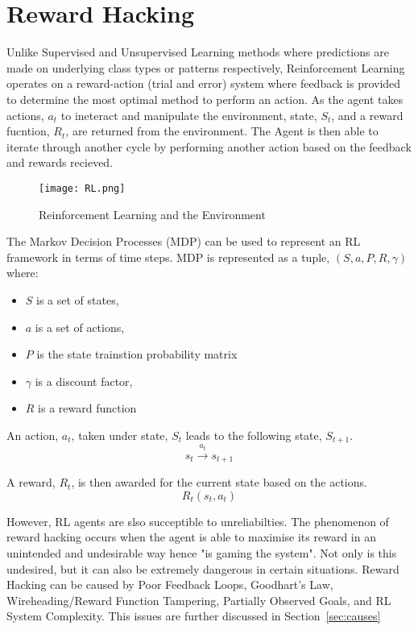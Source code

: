 \chapter{Reward Hacking}
Unlike Supervised and Unsupervised Learning methods where predictions are made on underlying class types or patterns respectively, 
Reinforcement Learning operates on a reward-action (trial and error) system where feedback is provided to determine the most optimal method to perform an action.
As the agent takes actions, $a_t$ to ineteract and manipulate the environment, state, $S_t$, and a reward fucntion, $R_t$, are returned from the environment. 
The Agent is then able to iterate through another cycle by performing another action based on the feedback and rewards recieved.

\begin{figure}[H]
    \centering
    \caption{Reinforcement Learning and the Environment \cite{amiri_mehrpouyan_fridman_mallik_nallanathan_matolak_2018}}
    \texttt{[image: RL.png]}
    \label{fig:RL}
\end{figure}

The Markov Decision Processes (MDP) can be used to represent an RL framework in terms of time steps.
MDP is represented as a tuple, $(S, a, P, R, \gamma)$ where:
\begin{itemize}
    \item $S$ is a set of states,
    \item $a$ is a set of actions,
    \item $P$ is the state trainstion probability matrix
    \item $\gamma$ is a discount factor, 
    \item $R$ is a reward function 
\end{itemize}   

An action, $a_t$, taken under state, $S_t$ leads to the following state, $S_{t+1}$. 
\begin{equation}
    s_t \xrightarrow{a_t} s_{t+1}
\end{equation}

A reward, $R_t$, is then awarded for the current state based on the actions.
\begin{equation}
    R_t(s_t, a_t) 
\end{equation}

However, RL agents are slso succeptible to unreliabilties. The phenomenon of reward hacking occurs when the agent is able to maximise its reward in an unintended and undesirable way hence "is gaming the system".
Not only is this undesired, but it can also be extremely dangerous in certain situations. 
Reward Hacking can be caused by Poor Feedback Loops, Goodhart's Law, Wireheading/Reward Function Tampering, Partially Observed Goals, and RL System Complexity. 
This issues are further discussed in Section~\ref{sec:causes}


